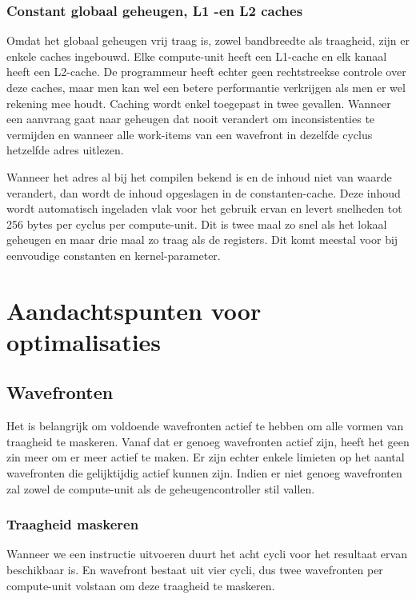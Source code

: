 \subsubsection{Constant globaal geheugen, L1 -en L2 caches}
Omdat het globaal geheugen vrij traag is, zowel bandbreedte als traagheid, zijn er enkele caches ingebouwd. Elke compute-unit heeft een L1-cache en elk kanaal heeft een L2-cache. De programmeur heeft echter geen rechtstreekse controle over deze caches, maar men kan wel een betere performantie verkrijgen als men er wel rekening mee houdt. Caching wordt enkel toegepast in twee gevallen. Wanneer een aanvraag gaat naar geheugen dat nooit verandert om inconsistenties te vermijden en wanneer alle work-items van een wavefront in dezelfde cyclus hetzelfde adres uitlezen.

Wanneer het adres al bij het compilen bekend is en de inhoud niet van waarde verandert, dan wordt de inhoud opgeslagen in de constanten-cache. Deze inhoud wordt automatisch ingeladen vlak voor het gebruik ervan en levert snelheden tot 256 bytes per cyclus per compute-unit. Dit is twee maal zo snel als het lokaal geheugen en maar drie maal zo traag als de registers. Dit komt meestal voor bij eenvoudige constanten en kernel-parameter.


\section{Aandachtspunten voor optimalisaties}

\subsection{Wavefronten}
Het is belangrijk om voldoende wavefronten actief te hebben om alle vormen van traagheid te maskeren. Vanaf dat er genoeg wavefronten actief zijn, heeft het geen zin meer om er meer actief te maken. Er zijn echter enkele limieten op het aantal wavefronten die gelijktijdig actief kunnen zijn. Indien er niet genoeg wavefronten zal zowel de compute-unit als de geheugencontroller stil vallen.

\subsubsection{Traagheid maskeren}
Wanneer we een instructie uitvoeren duurt het acht cycli voor het resultaat ervan beschikbaar is. En wavefront bestaat uit vier cycli, dus twee wavefronten per compute-unit volstaan om deze traagheid te maskeren.

